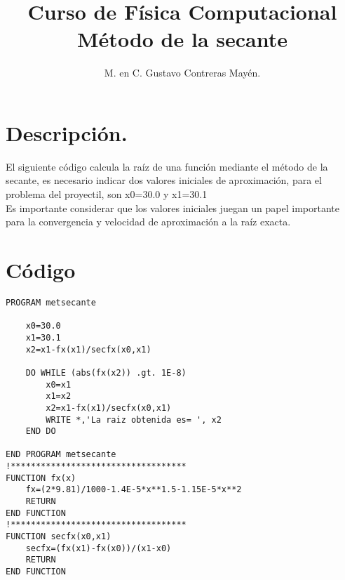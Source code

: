 \documentclass[12pt]{article}
\author{M. en C. Gustavo Contreras Mayén.}
\title{Curso de Física Computacional \\ Método de la secante}
\date{ }
\begin{document}
\maketitle
\fontsize{14}{14}\selectfont
\section{Descripción.}
El siguiente código calcula la raíz de una función mediante el método de la secante, es necesario indicar dos valores iniciales de aproximación, para el problema del proyectil, son x0=30.0 y x1=30.1\\
Es importante considerar que los valores iniciales juegan un papel importante para la convergencia y velocidad de aproximación a la raíz exacta.
\section{Código}
\begin{lstlisting}
PROGRAM metsecante

	x0=30.0
	x1=30.1
	x2=x1-fx(x1)/secfx(x0,x1)

	DO WHILE (abs(fx(x2)) .gt. 1E-8)
		x0=x1
		x1=x2
		x2=x1-fx(x1)/secfx(x0,x1)
		WRITE *,'La raiz obtenida es= ', x2
	END DO

END PROGRAM metsecante
!***********************************
FUNCTION fx(x)
	fx=(2*9.81)/1000-1.4E-5*x**1.5-1.15E-5*x**2
	RETURN
END FUNCTION
!***********************************
FUNCTION secfx(x0,x1)
	secfx=(fx(x1)-fx(x0))/(x1-x0)
	RETURN
END FUNCTION

\end{lstlisting}
\end{document}
